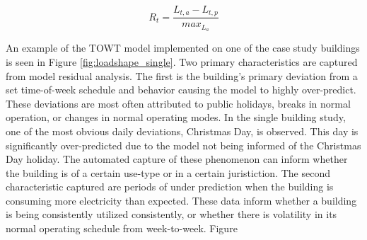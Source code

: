 \begin{equation}
\label{eq:residualerror}
R_t = \frac{L_{t,a} - L_{t,p}}{max_{L_a}}
\end{equation}

An example of the TOWT model implemented on one of the case study buildings is seen in Figure \ref{fig:loadshape_single}. Two primary characteristics are captured from model residual analysis. The first is the building's primary deviation from a set time-of-week schedule and behavior causing the model to highly over-predict. These deviations are most often attributed to public holidays, breaks in normal operation, or changes in normal operating modes. In the single building study, one of the most obvious daily deviations, Christmas Day, is observed. This day is significantly over-predicted due to the model not being informed of the Christmas Day holiday. The automated capture of these phenomenon can inform whether the building is of a certain use-type or in a certain juristiction. The second characteristic captured are periods of under prediction when the building is consuming more electricity than expected. These data inform whether a building is being consistently utilized consistently, or whether there is volatility in its normal operating schedule from week-to-week. Figure 